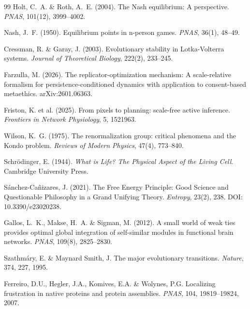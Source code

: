 \documentclass[12pt,a4paper]{article}
\theoremstyle{remark}
\begin{document}
\begin{thebibliography}{99}
Holt, C.~A. \& Roth, A.~E. (2004).
\newblock The Nash equilibrium: A perspective.
\newblock \textit{PNAS}, 101(12), 3999--4002.

Nash, J.~F. (1950).
\newblock Equilibrium points in n-person games.
\newblock \textit{PNAS}, 36(1), 48--49.

Cressman, R. \& Garay, J. (2003).
\newblock Evolutionary stability in Lotka-Volterra systems.
\newblock \textit{Journal of Theoretical Biology}, 222(2), 233--245.

Farzulla, M. (2026).
\newblock The replicator-optimization mechanism: A scale-relative formalism for persistence-conditioned dynamics with application to consent-based metaethics.
\newblock arXiv:2601.06363.

Friston, K. et al. (2025).
\newblock From pixels to planning: scale-free active inference.
\newblock \textit{Frontiers in Network Physiology}, 5, 1521963.

Wilson, K.~G. (1975).
\newblock The renormalization group: critical phenomena and the Kondo problem.
\newblock \textit{Reviews of Modern Physics}, 47(4), 773--840.

Schr\"odinger, E. (1944).
\newblock \textit{What is Life? The Physical Aspect of the Living Cell}.
\newblock Cambridge University Press.

S\'anchez-Ca\~nizares, J. (2021).
\newblock The Free Energy Principle: Good Science and Questionable Philosophy in a Grand Unifying Theory.
\newblock \textit{Entropy}, 23(2), 238.
\newblock DOI: 10.3390/e23020238.

Gallos, L.~K., Makse, H.~A. \& Sigman, M. (2012).
\newblock A small world of weak ties provides optimal global integration of self-similar modules in functional brain networks.
\newblock \textit{PNAS}, 109(8), 2825--2830.

Szathm\'ary, E. \& Maynard Smith, J.
\newblock The major evolutionary transitions.
\newblock \textit{Nature}, 374, 227, 1995.

Ferreiro, D.U., Hegler, J.A., Komives, E.A. \& Wolynes, P.G.
\newblock Localizing frustration in native proteins and protein assemblies.
\newblock \textit{PNAS}, 104, 19819--19824, 2007.


\end{thebibliography}
\end{document}
